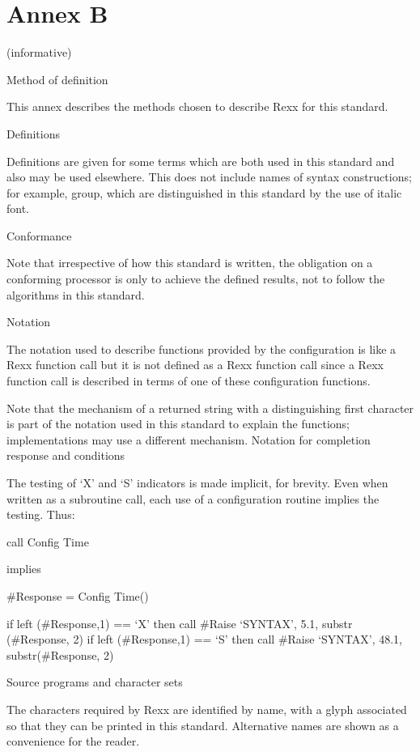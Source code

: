 \hypertarget{annex-b}{%
\chapter{Annex B}\label{annex-b}}

(informative)

Method of definition

This annex describes the methods chosen to describe Rexx for this
standard.

Definitions

Definitions are given for some terms which are both used in this
standard and also may be used elsewhere. This does not include names of
syntax constructions; for example, group, which are distinguished in
this standard by the use of italic font.

Conformance

Note that irrespective of how this standard is written, the obligation
on a conforming processor is only to achieve the defined results, not to
follow the algorithms in this standard.

Notation

The notation used to describe functions provided by the configuration is
like a Rexx function call but it is not defined as a Rexx function call
since a Rexx function call is described in terms of one of these
configuration functions.

Note that the mechanism of a returned string with a distinguishing first
character is part of the notation used in this standard to explain the
functions; implementations may use a different mechanism. Notation for
completion response and conditions

The testing of `X' and `S' indicators is made implicit, for brevity.
Even when written as a subroutine call, each use of a configuration
routine implies the testing. Thus:

call Config Time

implies

\#Response = Config Time()

if left (\#Response,1) == `X' then call \#Raise `SYNTAX', 5.1, substr
(\#Response, 2) if left (\#Response,1) == `S' then call \#Raise
`SYNTAX', 48.1, substr(\#Response, 2)

Source programs and character sets

The characters required by Rexx are identified by name, with a glyph
associated so that they can be printed in this standard. Alternative
names are shown as a convenience for the reader.

